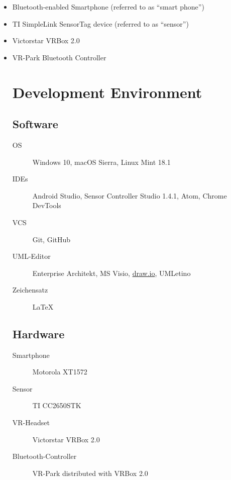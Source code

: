 \begin{itemize}
  \item Bluetooth-enabled Smartphone (referred to as ``smart phone'')
  \item TI SimpleLink SensorTag device (referred to as ``sensor'')
  \item Victorstar VRBox 2.0
  \item VR-Park Bluetooth Controller



\noindent \section{Development Environment}

\subsection{Software}

  \begin{description}
    \item[OS] Windows 10, macOS Sierra, Linux Mint 18.1
    \item[IDEs]  Android Studio, Sensor Controller Studio 1.4.1, Atom, Chrome DevTools
    \item[VCS] Git, GitHub
    \item[UML-Editor] Enterprise Architekt, MS Visio, \href{draw.io}{draw.io}, UMLetino
    \item[Zeichensatz] \LaTeX

  \end{description}

\subsection{Hardware}

  \begin{description}
    \item[Smartphone] Motorola XT1572
    \item[Sensor] TI CC2650STK
    \item[VR-Headset] Victorstar VRBox 2.0
    \item[Bluetooth-Controller] VR-Park distributed with VRBox 2.0
  \end{description}
\end{itemize}
